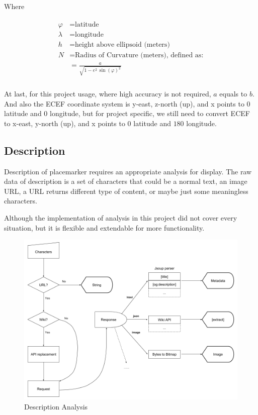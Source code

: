 Where

\[
\begin{array}{lr}
\begin{aligned}
\varphi &= \text{latitude}\\
\lambda &= \text{longitude}\\
h &= \text{height above ellipsoid (meters)}\\
N &= \text{Radius of Curvature (meters), defined as:}\\
&= \frac{a}{\sqrt{1 - e^2\,\sin(\varphi)^2}}\\
\end{aligned}
\end{array}
\]

At last, for this project usage, where high accuracy is not required, $a$ equals to $b$. And also the ECEF coordinate system is y-east, z-north (up), and x points to $0$ latitude and $0$ longitude, but for project specific, we still need to convert ECEF to x-east, y-north (up), and x points to $0$ latitude and $180$ longitude.

\subsection{Description}

Description of placemarker requires an appropriate analysis for display. The raw data of description is a set of characters that could be a normal text, an image URL, a URL returns different type of content, or maybe just some meaningless characters.

Although the implementation of analysis in this project did not cover every situation, but it is flexible and extendable for more functionality.

\begin{figure}[H]
\caption[description-analysis]{Description Analysis}
\label{fig:description-analysis}
\centering
\includegraphics[width=\linewidth]{Figures/description-analysis.png}
\decoRule
\end{figure}

